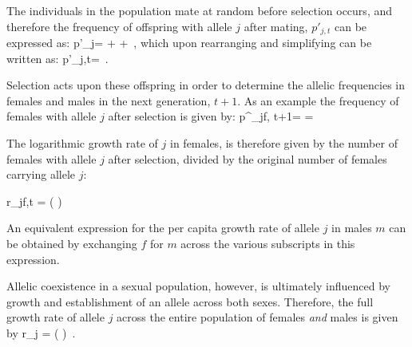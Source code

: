 \documentclass[12pt]{article}
\let\oldequation\equation
\let\oldendequation\endequation
\renewenvironment{equation}
  {\linenomathNonumbers\oldequation}
  {\oldendequation\endlinenomath}
\begin{document}
The individuals in the population mate at random before selection occurs, and therefore the frequency of offspring with allele $j$ after mating, $p'_{j,t}$ can be expressed as:
\begin{equation}
   p'_{j}=   +    +
     \,,
\end{equation}
which upon rearranging and simplifying can be written as:
\begin{equation}
   p'_{j,t}=  \,.
   \label{pprime}
\end{equation}

Selection acts upon these offspring in order to determine the allelic frequencies in females and males in the next generation, $t+1$. As an example the frequency  of females with allele $j$ after selection is given by:
\begin{equation}
   p^{\prime}_{jf, t+1}=  = 
\end{equation}

The logarithmic growth rate of $j$ in females, is therefore given by the number of females with allele $j$ after selection, divided by the original number of females carrying allele $j$:



\begin{equation}
    r_{jf,t} = \ln \left(  \right)
    \label{canonical}
\end{equation}


An equivalent expression for the per capita growth rate of allele $j$ in males $m$ can be obtained by exchanging $f$ for $m$ across the various subscripts in this expression.

Allelic coexistence in a sexual population, however, is ultimately influenced by growth and establishment of an allele across both sexes. Therefore, the full growth rate of allele $j$ across the entire population of females \emph{and} males is given by
\begin{equation}
    r_{j} = \ln \left(   \right) \,.
    \label{full}
\end{equation}
\end{document}
